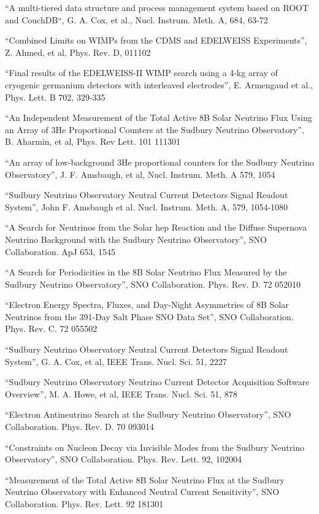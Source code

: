 \documentclass[11pt, a4paper]{article}
\newcommand{\virginyears}[1]{\marginpar{\scriptsize #1}}
\newcommand{\years}[1]{\noindent\virginyears{#1}}
\begin{document}
“A multi-tiered data structure and process management system based on ROOT and CouchDB“, G. A. Cox, et al., Nucl. Instrum. Meth. A, 684, 63-72

\years{2011} “Combined Limits on WIMPs from the CDMS and EDELWEISS Experiments”, Z. Ahmed, et al, Phys. Rev. D, 011102

“Final results of the EDELWEISS-II WIMP search using a 4-kg array of cryogenic germanium detectors with interleaved electrodes”, E. Armengaud et al., Phys. Lett. B 702, 329-335

\years{2008} “An Independent Measurement of the Total Active 8B Solar Neutrino Flux Using an Array of 3He Proportional Counters at the Sudbury Neutrino Observatory”, B. Aharmin, et al, Phys. Rev Lett. 101 111301

\years{2007} “An array of low-background 3He proportional counters for the Sudbury Neutrino Observatory”, J. F. Amsbaugh, et al, Nucl. Instrum. Meth. A 579, 1054

\years{2006} “Sudbury Neutrino Observatory Neutral Current Detectors Signal Readout System”, John F. Amsbaugh et al. Nucl. Instrum. Meth. A, 579, 1054-1080

“A Search for Neutrinos from the Solar hep Reaction and the Diffuse Supernova Neutrino Background with the Sudbury Neutrino Observatory”, SNO Collaboration. ApJ 653, 1545

\years{2005} “A Search for Periodicities in the 8B Solar Neutrino Flux Measured by the Sudbury Neutrino Observatory”, SNO Collaboration. Phys. Rev. D. 72 052010

“Electron Energy Spectra, Fluxes, and Day-Night Asymmetries of 8B Solar Neutrinos from the 391-Day Salt Phase SNO Data Set”, SNO Collaboration. Phys. Rev. C. 72 055502

\years{2004}  “Sudbury Neutrino Observatory Neutral Current Detectors Signal Readout System”, G. A. Cox, et al, IEEE Trans. Nucl. Sci. 51, 2227 

“Sudbury Neutrino Observatory Neutrino Current Detector Acquisition Software Overview”, M. A. Howe, et al, IEEE Trans. Nucl. Sci. 51, 878

“Electron Antineutrino Search at the Sudbury Neutrino Observatory”, SNO Collaboration.  Phys. Rev. D. 70 093014

“Constraints on Nucleon Decay via Invisible Modes from the Sudbury Neutrino Observatory”, SNO Collaboration.  Phys. Rev. Lett. 92, 102004

“Measurement of the Total Active 8B Solar Neutrino Flux at the Sudbury Neutrino Observatory with Enhanced Neutral Current Sensitivity”, SNO Collaboration. Phys. Rev. Lett. 92 181301
\end{document}
